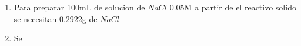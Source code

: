 \documentclass[12pt,a4paper]{report}
\begin{document}
\chapter{}

\begin{enumerate}[label=\alph*]
  \item Para preparar 100mL de solucion de $NaCl$ 0.05M a partir de el reactivo solido se necesitan 0.2922g de $NaCl$--

  \item Se
    
\end{enumerate}
\end{document}
